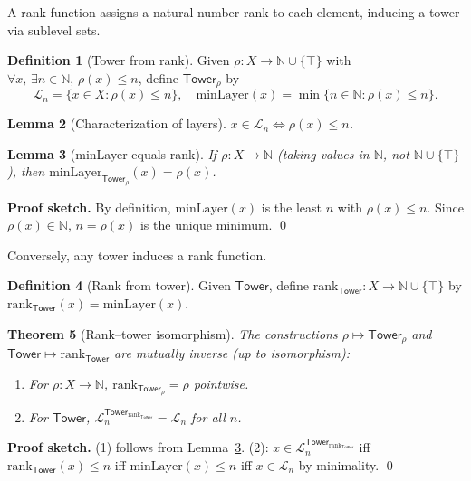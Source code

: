 \documentclass[11pt]{article}
\newtheorem{theorem}{Theorem}[section]
\newtheorem{lemma}[theorem]{Lemma}
\theoremstyle{definition}
\newtheorem{definition}[theorem]{Definition}
\theoremstyle{remark}
\newcommand{\layer}{\mathcal{L}}
\newcommand{\minLayer}{\mathrm{minLayer}}
\newcommand{\rank}{\mathrm{rank}}
\newcommand{\Tower}{\mathsf{Tower}}
\newcommand{\NN}{\mathbb{N}}
\newcommand{\WithTop}[1]{#1 \cup \{\top\}}
\begin{document}
A rank function assigns a natural-number rank to each element, inducing a tower via sublevel sets.

\begin{definition}[Tower from rank]
\label{def:tower-from-rank}
Given $\rho: X \to \WithTop{\NN}$ with $\forall x, \, \exists n \in \NN, \, \rho(x) \leq n$, define $\Tower_\rho$ by
\[
\layer_n = \{x \in X : \rho(x) \leq n\}, \quad \minLayer(x) = \min\{n \in \NN : \rho(x) \leq n\}.
\]
\end{definition}

\begin{lemma}[Characterization of layers]
\label{lem:tower-from-rank-layer}
$x \in \layer_n \iff \rho(x) \leq n$.
\end{lemma}

\begin{lemma}[minLayer equals rank]
\label{lem:minlayer-eq-rank}
If $\rho: X \to \NN$ (taking values in $\NN$, not $\WithTop{\NN}$), then $\minLayer_{\Tower_\rho}(x) = \rho(x)$.
\end{lemma}

\noindent\textbf{Proof sketch.}
By definition, $\minLayer(x)$ is the least $n$ with $\rho(x) \leq n$.
Since $\rho(x) \in \NN$, $n = \rho(x)$ is the unique minimum.
\qed

Conversely, any tower induces a rank function.

\begin{definition}[Rank from tower]
\label{def:rank-from-tower}
Given $\Tower$, define $\rank_\Tower: X \to \WithTop{\NN}$ by $\rank_\Tower(x) = \minLayer(x)$.
\end{definition}

\begin{theorem}[Rank--tower isomorphism]
\label{thm:rank-tower-iso}
The constructions $\rho \mapsto \Tower_\rho$ and $\Tower \mapsto \rank_\Tower$ are mutually inverse (up to isomorphism):
\begin{enumerate}
\item For $\rho: X \to \NN$, $\rank_{\Tower_\rho} = \rho$ pointwise.
\item For $\Tower$, $\layer_n^{\Tower_{\rank_\Tower}} = \layer_n$ for all $n$.
\end{enumerate}
\end{theorem}

\noindent\textbf{Proof sketch.}
(1) follows from Lemma~\ref{lem:minlayer-eq-rank}.
(2): $x \in \layer_n^{\Tower_{\rank_\Tower}}$ iff $\rank_\Tower(x) \leq n$ iff $\minLayer(x) \leq n$ iff $x \in \layer_n$ by minimality.
\qed
\end{document}
